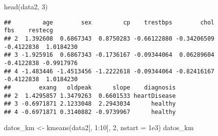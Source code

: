 \documentclass[
]{article}
\newenvironment{Shaded}{\begin{snugshade}}{\end{snugshade}}
\newcommand{\AttributeTok}[1]{\textcolor[rgb]{0.77,0.63,0.00}{#1}}
\newcommand{\DecValTok}[1]{\textcolor[rgb]{0.00,0.00,0.81}{#1}}
\newcommand{\FloatTok}[1]{\textcolor[rgb]{0.00,0.00,0.81}{#1}}
\newcommand{\FunctionTok}[1]{\textcolor[rgb]{0.00,0.00,0.00}{#1}}
\newcommand{\NormalTok}[1]{#1}
\newcommand{\OtherTok}[1]{\textcolor[rgb]{0.56,0.35,0.01}{#1}}
\newcommand{\SpecialCharTok}[1]{\textcolor[rgb]{0.00,0.00,0.00}{#1}}
\begin{document}
\begin{Shaded}
\begin{Highlighting}[]
\FunctionTok{head}\NormalTok{(data2, }\DecValTok{3}\NormalTok{)}
\end{Highlighting}
\end{Shaded}

\begin{verbatim}
##         age        sex         cp    trestbps        chol        fbs    restecg
## 2  1.392608  0.6867343  0.8750283 -0.66122880 -0.34206509 -0.4122838  1.0184230
## 3 -1.925916  0.6867343 -0.1736167 -0.09344064  0.06289604 -0.4122838 -0.9917976
## 4 -1.483446 -1.4513456 -1.2222618 -0.09344064 -0.82416167 -0.4122838  1.0184230
##        exang   oldpeak      slope    diagnosis
## 2  1.4295857 1.3479263  0.6601533 heartDisease
## 3 -0.6971871 2.1233048  2.2943034      healthy
## 4 -0.6971871 0.3140882 -0.9739967      healthy
\end{verbatim}

\begin{Shaded}
\begin{Highlighting}[]
\NormalTok{datos\_km }\OtherTok{\textless{}{-}} \FunctionTok{kmeans}\NormalTok{(data2[, }\DecValTok{1}\SpecialCharTok{:}\DecValTok{10}\NormalTok{], }\DecValTok{2}\NormalTok{, }\AttributeTok{nstart =} \FloatTok{1e3}\NormalTok{)}
\NormalTok{datos\_km}
\end{Highlighting}
\end{Shaded}
\end{document}
